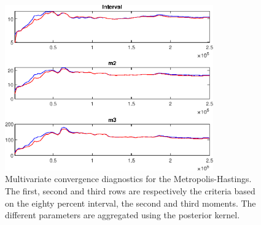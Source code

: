  
\begin{figure}[H]
\centering 
\includegraphics[width=0.8\textwidth]{BRS_sectoral_wo_fixed_cost/Output/BRS_sectoral_wo_fixed_cost_mdiag}
\caption{Multivariate convergence diagnostics for the Metropolis-Hastings.
The first, second and third rows are respectively the criteria based on
the eighty percent interval, the second and third moments. The different 
parameters are aggregated using the posterior kernel.}\label{Fig:MultivariateDiagnostics}
\end{figure}

